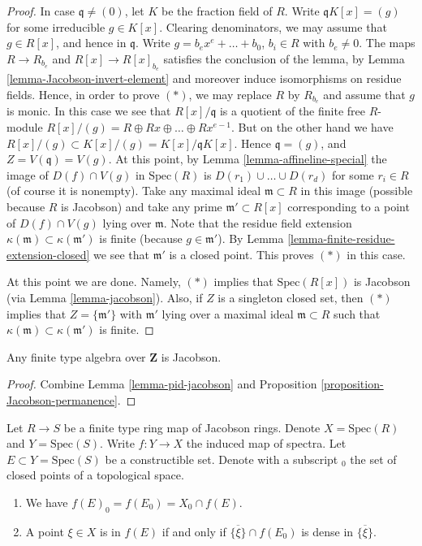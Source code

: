 \begin{proof}
\medskip\noindent
In case $\mathfrak q \not = (0)$, let $K$ be the
fraction field of $R$. Write $\mathfrak q K[x]
= (g)$ for some irreducible $g \in K[x]$. Clearing
denominators, we may assume that $g \in R[x]$, and
hence in $\mathfrak q$. Write $g = b_e x^e + \ldots + b_0$,
$b_i \in R$ with $b_e \not= 0$.
The maps $R \to R_{b_e}$ and $R[x] \to R[x]_{b_e}$
satisfies the conclusion of the lemma, by Lemma
\ref{lemma-Jacobson-invert-element} and moreover induce
isomorphisms on residue fields. Hence, in order to prove $(*)$,
we may replace $R$ by $R_{b_e}$ and assume that $g$ is monic.
In this case we see that $R[x]/\mathfrak q$ is a
quotient of the finite free $R$-module
$R[x]/(g) = R \oplus Rx \oplus \ldots \oplus Rx^{e-1}$.
But on the other hand we have $R[x]/(g) \subset K[x]/(g)
= K[x]/\mathfrak q K[x]$. Hence $\mathfrak q = (g)$, and
$Z = V(\mathfrak q) = V(g)$. At this point, by Lemma
\ref{lemma-affineline-special} the image of $D(f) \cap V(g)$
in $\text{Spec}(R)$ is $D(r_1) \cup \ldots \cup D(r_d)$
for some $r_i \in R$ (of course it is nonempty).
Take any maximal ideal $\mathfrak m \subset R$ in this
image (possible because $R$ is Jacobson) and take any
prime $\mathfrak m' \subset R[x]$
corresponding to a point of $D(f) \cap V(g)$
lying over $\mathfrak m$. Note that the residue field
extension $\kappa(\mathfrak m) \subset \kappa(\mathfrak m')$
is finite (because $g \in \mathfrak m'$). By
Lemma \ref{lemma-finite-residue-extension-closed}
we see that $\mathfrak m'$ is a closed point.
This proves $(*)$ in this case.

\medskip\noindent
At this point we are done. Namely, $(*)$ implies
that $\text{Spec}(R[x])$ is Jacobson (via Lemma \ref{lemma-jacobson}).
Also, if $Z$ is a singleton closed set, then $(*)$ implies that
$Z = \{ \mathfrak m' \}$ with $\mathfrak m'$ lying over a maximal
ideal $\mathfrak m \subset R$ such that $\kappa(\mathfrak m)
\subset \kappa(\mathfrak m')$ is finite.
\end{proof}

\begin{lemma}
\label{lemma-corollary-jacobson}
Any finite type algebra over $\mathbf{Z}$ is Jacobson.
\end{lemma}

\begin{proof}
Combine Lemma \ref{lemma-pid-jacobson} and
Proposition \ref{proposition-Jacobson-permanence}.
\end{proof}

\begin{lemma}
\label{lemma-image-finite-type-map-Jacobson-rings}
Let $R \to S$ be a finite type ring map of Jacobson rings.
Denote $X = \text{Spec}(R)$ and $Y = \text{Spec}(S)$.
Write $f : Y \to X$ the induced
map of spectra. Let $E \subset Y = \text{Spec}(S)$ be a
constructible set. Denote with a subscript ${}_0$ the set
of closed points of a topological space.
\begin{enumerate}
\item We have $f(E)_0 = f(E_0) = X_0 \cap f(E)$.
\item A point $\xi \in X$ is in $f(E)$ if and only if
$\overline{\{\xi\}} \cap f(E_0)$ is dense in $\overline{\{\xi\}}$.
\end{enumerate}
\end{lemma}


